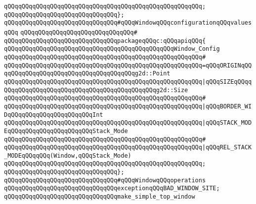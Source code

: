 \verb|qQQqqQQqqQQqqQQqqQQqqQQqqQQqqQQqqQQqqQQqqQQqqQQqqQQqqQQq;|\newline
\verb|qQQqqQQqqQQqqQQqqQQqqQQqqQQqqQQq};|\newline
\newline
\verb|qQQqqQQqqQQqqQQqqQQqqQQqqQQqqQQq#qQQqWindowqQQqconfigurationqQQqvaluesqQQq|\newline
\verb|qQQqqQQqqQQqqQQqqQQqqQQqqQQqqQQq#|\newline
\verb|qQQqqQQqqQQqqQQqqQQqqQQqqQQqqQQqpackageqQQqc:qQQqapiqQQq{|\newline
\newline
\verb|qQQqqQQqqQQqqQQqqQQqqQQqqQQqqQQqqQQqqQQqqQQqqQQqWindow_Config|\newline
\verb|qQQqqQQqqQQqqQQqqQQqqQQqqQQqqQQqqQQqqQQqqQQqqQQqqQQqqQQq#|\newline
\verb|qQQqqQQqqQQqqQQqqQQqqQQqqQQqqQQqqQQqqQQqqQQqqQQqqQQqqQQq=qQQqORIGINqQQqqQQqqQQqqQQqqQQqqQQqqQQqqQQqqQQqqQQqg2d::Point|\newline
\verb|qQQqqQQqqQQqqQQqqQQqqQQqqQQqqQQqqQQqqQQqqQQqqQQqqQQqqQQq|\verb#|qQQqSIZEqQQqqQQqqQQqqQQqqQQqqQQqqQQqqQQqqQQqqQQqqQQqqQQqg2d::Size#\newline
\verb|qQQqqQQqqQQqqQQqqQQqqQQqqQQqqQQqqQQqqQQqqQQqqQQqqQQqqQQq#|\newline
\verb|qQQqqQQqqQQqqQQqqQQqqQQqqQQqqQQqqQQqqQQqqQQqqQQqqQQqqQQq|\verb#|qQQqBORDER_WIDqQQqqQQqqQQqqQQqqQQqqQQqInt#\newline
\verb|qQQqqQQqqQQqqQQqqQQqqQQqqQQqqQQqqQQqqQQqqQQqqQQqqQQqqQQq|\verb#|qQQqSTACK_MODEqQQqqQQqqQQqqQQqqQQqqQQqStack_Mode#\newline
\verb|qQQqqQQqqQQqqQQqqQQqqQQqqQQqqQQqqQQqqQQqqQQqqQQqqQQqqQQq#|\newline
\verb|qQQqqQQqqQQqqQQqqQQqqQQqqQQqqQQqqQQqqQQqqQQqqQQqqQQqqQQq|\verb#|qQQqREL_STACK_MODEqQQqqQQq(Window,qQQqStack_Mode)#\newline
\verb|qQQqqQQqqQQqqQQqqQQqqQQqqQQqqQQqqQQqqQQqqQQqqQQqqQQqqQQq;|\newline
\verb|qQQqqQQqqQQqqQQqqQQqqQQqqQQqqQQq};|\newline
\newline
\verb|qQQqqQQqqQQqqQQqqQQqqQQqqQQqqQQq#qQQqWindowqQQqoperations|\newline
\newline
\verb|qQQqqQQqqQQqqQQqqQQqqQQqqQQqqQQqexceptionqQQqBAD_WINDOW_SITE;|\newline
\newline
\verb|qQQqqQQqqQQqqQQqqQQqqQQqqQQqqQQqmake_simple_top_window|\newline
